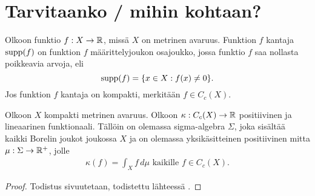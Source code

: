 \documentclass[12pt,oneside,a4paper]{amsbook} %
\begin{document}
\section{Tarvitaanko / mihin kohtaan?}

\begin{definition}
    Olkoon funktio $f:X \to \mathbb{R}$, missä $X$ on metrinen avaruus. Funktion $f$ kantaja $\operatorname{supp}(f)$ on funktion $f$ määrittelyjoukon osajoukko, jossa funktio $f$ saa nollasta poikkeavia arvoja, eli
    \begin{equation*}
        \operatorname{supp}(f) = \{x \in X : f(x) \ne 0\}.
    \end{equation*}
     Jos funktion $f$ kantaja on kompakti, merkitään $f \in C_c(X)$.
\end{definition}

\begin{theorem}\label{thm:Riesz}
    Olkoon $X$ kompakti metrinen avaruus. Olkoon $\kappa:C_c(X) \to \mathbb{R}$ positiivinen ja lineaarinen funktionaali. Tällöin on olemassa sigma-algebra $\Sigma$, joka sisältää kaikki Borelin joukot joukossa $X$ ja on olemassa yksikäsitteinen positiivinen mitta $\mu:\Sigma \to {\mathbb{R}^{+}}$, jolle
    \begin{align*}
        \kappa (f) = \int_X f \, d\mu \text{ kaikille } f \in C_c(X).
    \end{align*}
\end{theorem}
\begin{proof}
    Todistus sivuutetaan, todistettu lähteessä \cite[s. 40]{rudin}.
\end{proof}
\end{document}
